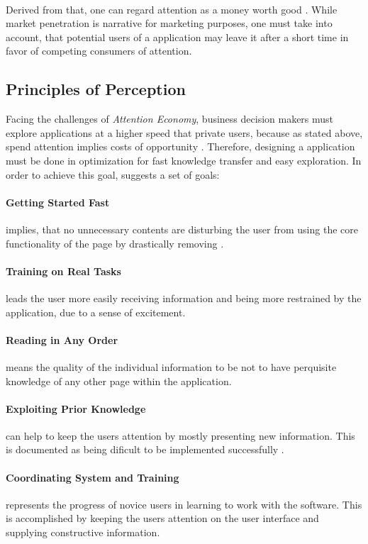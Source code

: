 \paragraph*{} Derived from that, one can regard attention as a money worth good \parencite[cf.][]{Davenport.2001}. While market penetration is narrative for marketing purposes, one must take into account, that potential users of a application may leave it after a short time in favor of competing consumers of attention.
\subsection{Principles of Perception}
Facing the challenges of \textit{Attention Economy}, business decision makers must explore applications at a higher speed that private users, because as stated above, spend attention implies costs of opportunity \parencite[cf.][]{Bakar.2017}. Therefore, designing a application must be done in optimization for fast knowledge transfer and easy exploration. In order to achieve this goal, \textcite{Bakar.2017} suggests a set of goals:
\paragraph*{Getting Started Fast} implies, that no unnecessary contents are disturbing the user from using the core functionality of the page by drastically removing   \parencite{Bakar.2017}. 
\paragraph*{Training on Real Tasks} leads the user more easily receiving information and being more restrained by the application, due to a sense of excitement.
\paragraph*{Reading in Any Order} means the quality of the individual information to be not to have perquisite knowledge of any other page within the application.
\paragraph*{Exploiting Prior Knowledge} can help to keep the users attention by mostly presenting new information. This is documented as being dificult to be implemented successfully .
\paragraph*{Coordinating System and Training} represents the progress of novice users in learning to work with the software. This is accomplished by keeping the users attention on the user interface and supplying constructive information.
